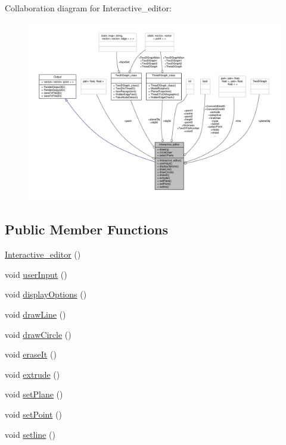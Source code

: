 Collaboration diagram for Interactive\+\_\+editor\+:
\nopagebreak
\begin{figure}[H]
\begin{center}
\leavevmode
\includegraphics[width=350pt]{classInteractive__editor__coll__graph}
\end{center}
\end{figure}
\subsection*{Public Member Functions}
\begin{DoxyCompactItemize}
\item 
\hyperlink{classInteractive__editor_aa1f49f25e8ec3ca29dd7ce2fc4cffb1a}{Interactive\+\_\+editor} ()
\item 
void \hyperlink{classInteractive__editor_aa7d472e169eed213d1fcb874c6f5a6cd}{user\+Input} ()
\item 
void \hyperlink{classInteractive__editor_a8078ec1404bdd80e09320d14d198f628}{display\+Options} ()
\item 
void \hyperlink{classInteractive__editor_a30310b574f37f50f7d40e2acebf93723}{draw\+Line} ()
\item 
void \hyperlink{classInteractive__editor_a630465bba8474cf03efb3e0716009e1f}{draw\+Circle} ()
\item 
void \hyperlink{classInteractive__editor_a29bd8d4ac9bff675360a661ab9f04db4}{erase\+It} ()
\item 
void \hyperlink{classInteractive__editor_a6543fe863fa4a902fb4dd71cf6318533}{extrude} ()
\item 
void \hyperlink{classInteractive__editor_a1332966f87d6df07b217ed663105379b}{set\+Plane} ()
\item 
void \hyperlink{classInteractive__editor_a21c3f807f2e892c9b40cae987593e2cb}{set\+Point} ()
\item 
void \hyperlink{classInteractive__editor_acf3e55ad6b947af72b83d996f409c176}{setline} ()
\end{DoxyCompactItemize}
